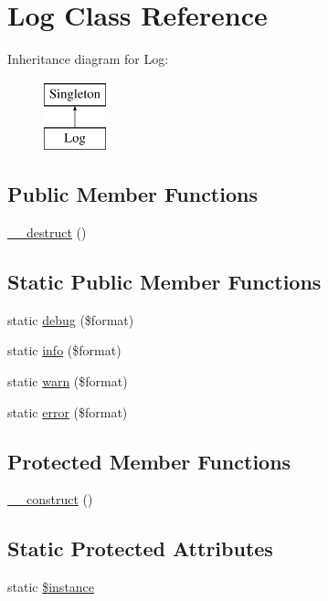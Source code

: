 \hypertarget{classLog}{
\section{Log Class Reference}
\label{classLog}
}
Inheritance diagram for Log:\begin{figure}[H]
\begin{center}
\leavevmode
\includegraphics[height=2.000000cm]{classLog}
\end{center}
\end{figure}
\subsection*{Public Member Functions}
\begin{DoxyCompactItemize}
\item 
\hyperlink{classLog_a8a98440f17cf6a9ce14597897e845abf}{\_\-\_\-destruct} ()
\end{DoxyCompactItemize}
\subsection*{Static Public Member Functions}
\begin{DoxyCompactItemize}
\item 
static \hyperlink{classLog_a9cbcd40831b44a7fc43494d32544ca45}{debug} (\$format)
\item 
static \hyperlink{classLog_aad760acd04b0f64236f8d90519a3bef8}{info} (\$format)
\item 
static \hyperlink{classLog_a3dae74a7d221b316861c88726d07c65a}{warn} (\$format)
\item 
static \hyperlink{classLog_ae64520f1abc38b59df669bd62174317e}{error} (\$format)
\end{DoxyCompactItemize}
\subsection*{Protected Member Functions}
\begin{DoxyCompactItemize}
\item 
\hyperlink{classLog_ab413a80ef95f69c127319bbfc7cbb9e7}{\_\-\_\-construct} ()
\end{DoxyCompactItemize}
\subsection*{Static Protected Attributes}
\begin{DoxyCompactItemize}
\item 
static \hyperlink{classLog_af469fce19eb78a62dce34d2925348d53}{\$instance}
\end{DoxyCompactItemize}


